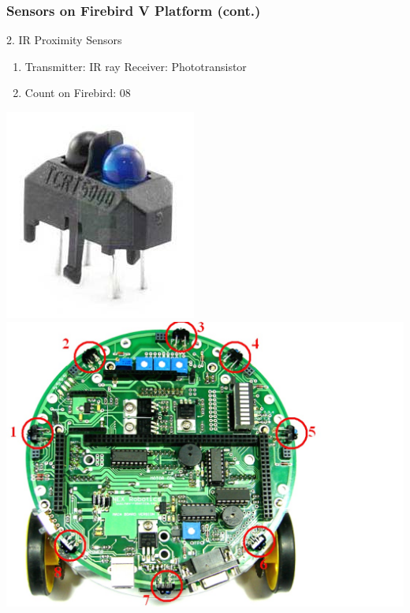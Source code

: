 \documentclass[10pt,red]{beamer}
\begin{document}
\begin{frame}
	\frametitle{Sensors on Firebird V Platform (cont.)} 
	2. IR Proximity Sensors	\pause
		\vfill
		\begin{minipage}[c]{0.5\textwidth}
			\begin{enumerate}
				\item <+-|alert@+> Transmitter: IR ray \qquad Receiver: Phototransistor \\[10pt]
				\item <+-|alert@+> Count on Firebird: 08
			\end{enumerate}
		\end{minipage}
		\hfill
		\begin{minipage}[c]{0.4\textwidth}
			\includegraphics[width=0.4\linewidth]{ir_proximity}
		\vfill
			\includegraphics[width=0.8\linewidth]{proximity_on_fb}
		\end{minipage}
\end{frame}
\end{document}
